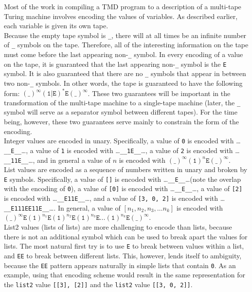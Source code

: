 \documentclass[11pt]{report}
\begin{document}
\indent Most of the work in compiling a TMD program to a description of a multi-tape Turing machine involves encoding the values of variables. As described earlier, each variable is given its own tape. \\

Because the empty tape symbol is \texttt{\_}, there will at all times be an infinite number of \texttt{\_} symbols on the tape. Therefore, all of the interesting information on the tape must come before the last appearing non-\texttt{\_} symbol. In every encoding of a value on the tape, it is guaranteed that the last appearing non-\texttt{\_} symbol is the \texttt{E} symbol. It is also guaranteed that there are no \texttt{\_} symbols that appear in between two non-\texttt{\_} symbols. In other words, the tape is guaranteed to have the following form: $(\texttt{\_})^\infty(\texttt{1}|\texttt{E})^*\texttt{E}(\texttt{\_})^\infty$. These two guarantees will be important in the transformation of the multi-tape machine to a single-tape machine (later, the \texttt{\_} symbol will serve as a separator symbol between different tapes). For the time being, however, these two guarantees serve mainly to constrain the form of the encoding. \\

Integer values are encoded in unary. Specifically, a value of \texttt{0} is encoded with \dots\texttt{\_\_E\_\_}\dots, a value of \texttt{1} is encoded with \dots\texttt{\_\_1E\_\_}\dots, a value of \texttt{2} is encoded with \dots\texttt{\_\_11E\_\_}\dots, and in general a value of $n$ is encoded with $(\texttt{\_})^\infty(\texttt{1})^n\texttt{E}(\texttt{\_})^\infty$. \\

List values are encoded as a sequence of numbers written in unary and broken by \texttt{E} symbols. Specifically, a value of \texttt{[]} is encoded with \dots\texttt{\_\_E\_\_}\dots (note the overlap with the encoding of \texttt{0}), a value of \texttt{[0]} is encoded with \dots\texttt{\_\_E\_\_}\dots, a value of \texttt{[2]} is encoded with \dots\texttt{\_\_E11E\_\_}\dots, and a value of \texttt{[3, 0, 2]} is encoded with \dots\texttt{\_\_E111EE11E\_\_}\dots. In general, a value of $[n_1, n_2, n_3, \dots n_k]$ is encoded with $(\texttt{\_})^\infty\texttt{E}(\texttt{1})^{n_1}\texttt{E}(\texttt{1})^{n_2}\texttt{E}(\texttt{1})^{n_3}\texttt{E}\dots(\texttt{1})^{n_k}\texttt{E}(\texttt{\_})^\infty$. \\

List2 values (lists of lists) are more challenging to encode than lists, because there is not an additional symbol which can be used to break apart the values for lists. The most natural first try is to use \texttt{E} to break between values within a list, and \texttt{EE} to break between different lists. This, however, lends itself to ambiguity, because the \texttt{EE} pattern appears naturally in simple lists that contain \texttt{0}. As an example, using that encoding scheme would result in the same representation for the \texttt{list2} value \texttt{[[3], [2]]} and the \texttt{list2} value \texttt{[[3, 0, 2]]}. \\
\end{document}

